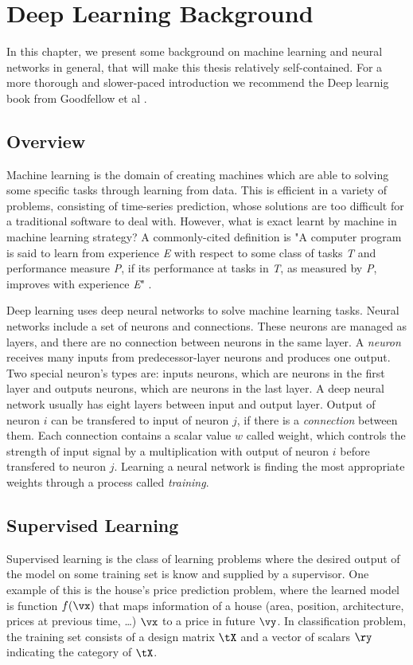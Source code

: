 \chapter{Deep Learning Background}
\label{chap-2-dl-background}
\begin{ChapAbstract}
In this chapter, we present some background on machine learning and neural
networks in general, that will make this thesis relatively self-contained.
For a more thorough and slower-paced introduction we recommend the Deep
learnig book from Goodfellow et al \cite{dlbook}.
\end{ChapAbstract}

\section{Overview}
Machine learning is the domain of creating machines which are able to solving some specific tasks through learning from data. This is efficient in a variety of problems, consisting of time-series prediction, whose solutions are too difficult for a traditional software to deal with. However, what is exact learnt by machine in machine learning strategy? A commonly-cited definition is "A computer program is said to learn from experience \textit{E} with respect to some class of tasks \textit{T} and performance measure \textit{P}, if its performance at tasks in \textit{T}, as measured by \textit{P}, improves with experience \textit{E}" \cite{Mitchell:1997:ML}.

Deep learning uses deep neural networks to solve machine learning tasks. Neural networks include a set of neurons and connections. These neurons are managed as layers, and there are no connection between neurons in the same layer. A \textit{neuron} receives many inputs from predecessor-layer neurons and produces one output. Two special neuron's types are: inputs neurons, which are neurons in the first layer and outputs neurons, which are neurons in the last layer. A deep neural network usually has eight layers between input and output layer. Output of neuron $i$ can be transfered to input of neuron $j$, if there is a \textit{connection} between them. Each connection contains a scalar value $w$ called weight, which controls the strength of input signal by a multiplication with output of neuron $i$ before transfered to neuron $j$. Learning a neural network is finding the most appropriate weights through a process called \textit{training}.


\section{Supervised Learning}
Supervised learning is the class of learning problems where the desired output of the model on some training set is know and supplied by a supervisor. One example of this is the house's price prediction problem, where the learned model is function $\displaystyle f(\vx)$ that maps information of a house (area, position, architecture, prices at previous time, \dots) $\displaystyle \vx$ to a price in future $\displaystyle \vy$. In classification problem, the training set consists of a design matrix $\displaystyle \tX$ and a vector of scalars $\displaystyle \ry$ indicating the category of $\displaystyle \tX$. 

